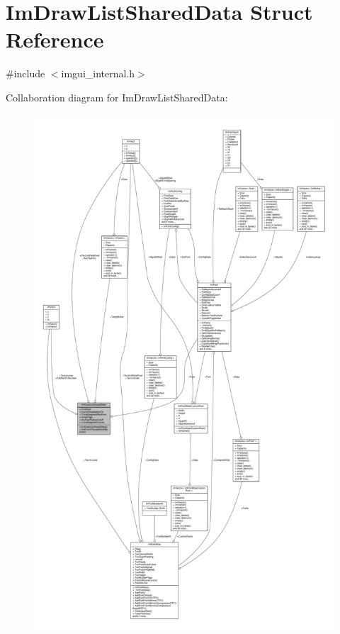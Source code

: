 \hypertarget{structImDrawListSharedData}{}\section{Im\+Draw\+List\+Shared\+Data Struct Reference}
\label{structImDrawListSharedData}


{\ttfamily \#include $<$imgui\+\_\+internal.\+h$>$}



Collaboration diagram for Im\+Draw\+List\+Shared\+Data\+:
\nopagebreak
\begin{figure}[H]
\begin{center}
\leavevmode
\includegraphics[height=550pt]{structImDrawListSharedData__coll__graph}
\end{center}
\end{figure}
